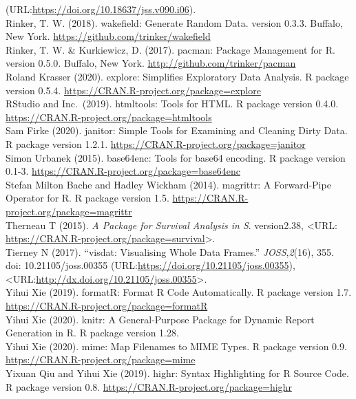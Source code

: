 \documentclass[
]{article}
\newenvironment{Shaded}{\begin{snugshade}}{\end{snugshade}}
\newcommand{\DataTypeTok}[1]{\textcolor[rgb]{0.00,0.34,0.68}{#1}}
\newcommand{\KeywordTok}[1]{\textcolor[rgb]{0.12,0.11,0.11}{\textbf{#1}}}
\newcommand{\NormalTok}[1]{\textcolor[rgb]{0.12,0.11,0.11}{#1}}
\newcommand{\OperatorTok}[1]{\textcolor[rgb]{0.12,0.11,0.11}{#1}}
\newcommand{\StringTok}[1]{\textcolor[rgb]{0.75,0.01,0.01}{#1}}
\begin{document}
(URL:\url{https://doi.org/10.18637/jss.v090.i06}).\\
Rinker, T. W. (2018). wakefield: Generate Random Data. version 0.3.3.
Buffalo, New York. \url{https://github.com/trinker/wakefield}\\
Rinker, T. W. \& Kurkiewicz, D. (2017). pacman: Package Management for
R. version 0.5.0. Buffalo, New York.
\url{http://github.com/trinker/pacman}\\
Roland Krasser (2020). explore: Simplifies Exploratory Data Analysis. R
package version 0.5.4.
\url{https://CRAN.R-project.org/package=explore}\\
RStudio and Inc.~(2019). htmltools: Tools for HTML. R package version
0.4.0. \url{https://CRAN.R-project.org/package=htmltools}\\
Sam Firke (2020). janitor: Simple Tools for Examining and Cleaning Dirty
Data. R package version 1.2.1.
\url{https://CRAN.R-project.org/package=janitor}\\
Simon Urbanek (2015). base64enc: Tools for base64 encoding. R package
version 0.1-3. \url{https://CRAN.R-project.org/package=base64enc}\\
Stefan Milton Bache and Hadley Wickham (2014). magrittr: A Forward-Pipe
Operator for R. R package version 1.5.
\url{https://CRAN.R-project.org/package=magrittr}\\
Therneau T (2015). \emph{A Package for Survival Analysis in S}.
version2.38, \textless URL:
\url{https://CRAN.R-project.org/package=survival}\textgreater.\\
Tierney N (2017). ``visdat: Visualising Whole Data Frames.''
\emph{JOSS},\emph{2}(16), 355. doi: 10.21105/joss.00355
(URL:\url{https://doi.org/10.21105/joss.00355}),
\textless URL:\url{http://dx.doi.org/10.21105/joss.00355}\textgreater.\\
Yihui Xie (2019). formatR: Format R Code Automatically. R package
version 1.7. \url{https://CRAN.R-project.org/package=formatR}\\
Yihui Xie (2020). knitr: A General-Purpose Package for Dynamic Report
Generation in R. R package version 1.28.\\
Yihui Xie (2020). mime: Map Filenames to MIME Types. R package version
0.9. \url{https://CRAN.R-project.org/package=mime}\\
Yixuan Qiu and Yihui Xie (2019). highr: Syntax Highlighting for R Source
Code. R package version 0.8.
\url{https://CRAN.R-project.org/package=highr}

\begin{Shaded}
\end{Shaded}
\end{document}
